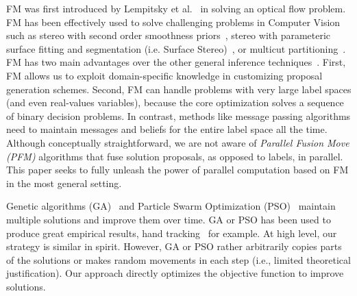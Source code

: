 
\noindent FM was first introduced by Lempitsky et al.~\cite{fusion_flow} in solving an
optical flow problem. FM has been effectively used to solve challenging
problems in Computer Vision such as stereo with second order smoothness
priors~\cite{second_order_stereo}, stereo with parameteric surface fitting and
segmentation (i.e. Surface Stereo)~\cite{surface_stereo}, or multicut
partitioning~\cite{fusion_moves_for_correlation_clustering}.
%
FM has two main advantages over the other general inference
techniques~\cite{TRW-S,loopy_belief_propagation}. First, FM allows us to
exploit domain-specific knowledge in customizing proposal generation
schemes. Second, FM can handle problems with very large label spaces
(and even real-values variables), because the core optimization
solves a sequence of binary decision problems.
%
In contrast, methods like message passing algorithms need to maintain
messages and beliefs for the entire label space all the time.
%
Although conceptually straightforward, we are not aware of {\it Parallel
  Fusion Move (PFM)} algorithms that fuse solution proposals, as opposed to
labels, in parallel. This paper seeks to fully unleash the power of
parallel computation based on FM in the most general setting.



\noindent
Genetic algorithms (GA)~\cite{ga} and Particle Swarm
Optimization (PSO)~\cite{pso} maintain multiple solutions and improve
them over time.
%
GA or PSO has been used to produce great empirical results,
hand tracking~\cite{pushmeet_hand_tracking} for example.
%
At high level, our strategy is similar in spirit. However, GA or PSO
rather arbitrarily copies parts of the solutions or makes random movements
in each step (i.e., limited theoretical justification).
%
Our approach directly optimizes the objective function to improve
solutions.


